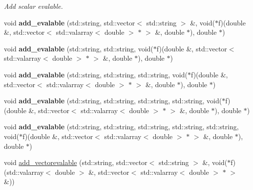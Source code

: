 \begin{CompactItemize}
\begin{CompactList}\small\item\em Add scalar evalable. \item\end{CompactList}\item 
\hypertarget{classmeasurements_e51bfb40c96e7183bf8e64910758f303}{
void \textbf{add\_\-evalable} (std::string, std::vector$<$ std::string $>$ \&, void($\ast$f)(double \&, std::vector$<$ std::valarray$<$ double $>$ $\ast$ $>$ \&, double $\ast$), double $\ast$)}
\label{classmeasurements_e51bfb40c96e7183bf8e64910758f303}

\item 
\hypertarget{classmeasurements_526b2cee83b38eaa3e23146adf3d5682}{
void \textbf{add\_\-evalable} (std::string, std::string, void($\ast$f)(double \&, std::vector$<$ std::valarray$<$ double $>$ $\ast$ $>$ \&, double $\ast$), double $\ast$)}
\label{classmeasurements_526b2cee83b38eaa3e23146adf3d5682}

\item 
\hypertarget{classmeasurements_63eea82f813298bca869a27d156713d5}{
void \textbf{add\_\-evalable} (std::string, std::string, std::string, void($\ast$f)(double \&, std::vector$<$ std::valarray$<$ double $>$ $\ast$ $>$ \&, double $\ast$), double $\ast$)}
\label{classmeasurements_63eea82f813298bca869a27d156713d5}

\item 
\hypertarget{classmeasurements_66ebee17003029e448111a47f9634ae5}{
void \textbf{add\_\-evalable} (std::string, std::string, std::string, std::string, void($\ast$f)(double \&, std::vector$<$ std::valarray$<$ double $>$ $\ast$ $>$ \&, double $\ast$), double $\ast$)}
\label{classmeasurements_66ebee17003029e448111a47f9634ae5}

\item 
\hypertarget{classmeasurements_ca8d3e880ebf3ee15aca9005bc121836}{
void \textbf{add\_\-evalable} (std::string, std::string, std::string, std::string, std::string, void($\ast$f)(double \&, std::vector$<$ std::valarray$<$ double $>$ $\ast$ $>$ \&, double $\ast$), double $\ast$)}
\label{classmeasurements_ca8d3e880ebf3ee15aca9005bc121836}

\item 
\hypertarget{classmeasurements_86ccb13b71d30b47f1e55dce771ccc45}{
void \hyperlink{classmeasurements_86ccb13b71d30b47f1e55dce771ccc45}{add\_\-vectorevalable} (std::string, std::vector$<$ std::string $>$ \&, void($\ast$f)(std::valarray$<$ double $>$ \&, std::vector$<$ std::valarray$<$ double $>$ $\ast$ $>$ \&))}
\label{classmeasurements_86ccb13b71d30b47f1e55dce771ccc45}


\end{CompactItemize}
